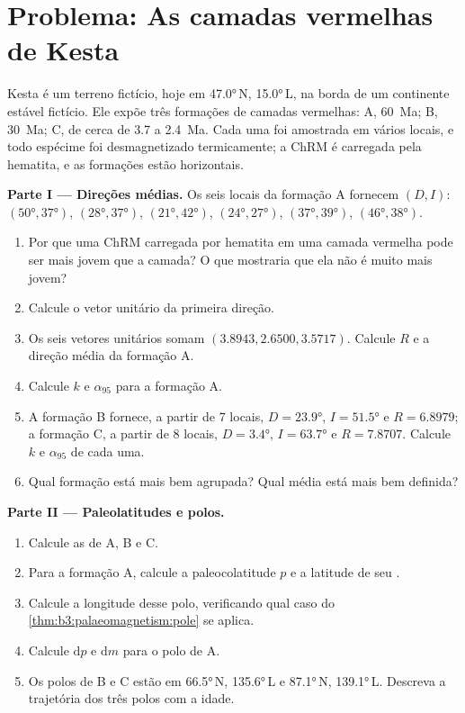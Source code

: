 \section{Problema: As camadas vermelhas de Kesta}

\begin{problem}
\label{pb:b3:palaeomagnetism:1}
Kesta é um terreno fictício, hoje em \ang{47.0}\,N, \ang{15.0}\,L, na borda
de um continente estável fictício. Ele expõe três formações de camadas vermelhas: A,
\qty{60}{Ma}; B, \qty{30}{Ma}; C, de cerca de 3.7 a \qty{2.4}{Ma}. Cada uma foi
amostrada em vários locais, e todo espécime foi desmagnetizado termicamente; a
ChRM é carregada pela hematita, e as formações estão horizontais.

\medskip\noindent\textbf{Parte I --- Direções médias.} Os seis locais da
formação A fornecem $(D, I)$: $(\ang{50}, \ang{37})$, $(\ang{28}, \ang{37})$,
$(\ang{21}, \ang{42})$, $(\ang{24}, \ang{27})$, $(\ang{37}, \ang{39})$,
$(\ang{46}, \ang{38})$.
\begin{enumerate}
  \item Por que uma ChRM carregada por hematita em uma camada vermelha pode ser mais jovem que a
        camada? O que mostraria que ela não é muito mais jovem?
  \item Calcule o vetor unitário da primeira direção.
  \item Os seis vetores unitários somam $(3.8943, 2.6500, 3.5717)$. Calcule $R$ e
        a direção média da formação A.
  \item Calcule $k$ e $\alpha_{95}$ para a formação A.
  \item A formação B fornece, a partir de 7 locais, $D = \ang{23.9}$, $I = \ang{51.5}$ e
        $R = 6.8979$; a formação C, a partir de 8 locais, $D = \ang{3.4}$, $I =
        \ang{63.7}$ e $R = 7.8707$. Calcule $k$ e $\alpha_{95}$ de cada uma.
  \item Qual formação está mais bem agrupada? Qual média está mais bem definida?
\end{enumerate}

\medskip\noindent\textbf{Parte II --- Paleolatitudes e polos.}
\begin{enumerate}[resume]
  \item Calcule as  de A, B e C.
  \item Para a formação A, calcule a paleocolatitude $p$ e a latitude de
        seu .
  \item Calcule a longitude desse polo, verificando qual caso do
        \cref{thm:b3:palaeomagnetism:pole} se aplica.
  \item Calcule $\mathrm dp$ e $\mathrm dm$ para o polo de A.
  \item Os polos de B e C estão em \ang{66.5}\,N, \ang{135.6}\,L e
        \ang{87.1}\,N, \ang{139.1}\,L. Descreva a trajetória dos três polos
        com a idade.
\end{enumerate}


\end{problem}
